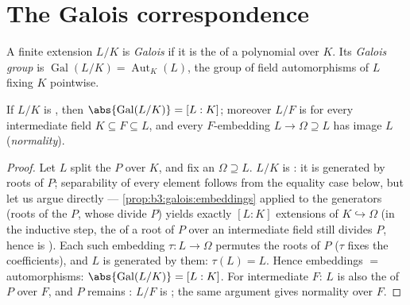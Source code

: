 \section{The Galois correspondence}

\begin{definition}\label{def:b3:galois:galois}
A finite extension $L/K$ is \emph{Galois}
if it is the  of a \emph{} polynomial
over $K$. Its \emph{Galois group} is
$\operatorname{Gal}(L/K) = \operatorname{Aut}_K(L)$, the group of
field automorphisms of $L$ fixing $K$ pointwise.
\end{definition}

\begin{proposition}\label{prop:b3:galois:galoisorder}
If $L/K$ is , then $\abs{\operatorname{Gal}(L/K)} =
[L:K]$; moreover $L/F$ is  for every intermediate field $K
\subseteq F \subseteq L$, and every $F$-embedding $L \to \Omega
\supseteq L$ has image $L$ (\emph{normality}).
\end{proposition}

\begin{proof}
Let $L$ split the  $P$ over $K$, and fix an  $\Omega \supseteq L$. $L/K$ is : it is generated
by roots of $P$; separability of every element follows from the
equality case below, but let us argue directly ---
\cref{prop:b3:galois:embeddings} applied to the generators (roots
of the  $P$, whose  divide $P$)
yields exactly $[L:K]$ extensions of $K \hookrightarrow \Omega$
(in the inductive step, the  of a root of $P$
over an intermediate field still divides $P$, hence is
). Each such embedding $\tau \colon L \to \Omega$
permutes the roots of $P$ ($\tau$ fixes the coefficients), and
$L$ is generated by them: $\tau(L) = L$. Hence embeddings $=$
automorphisms: $\abs{\operatorname{Gal}(L/K)} = [L:K]$. For
intermediate $F$: $L$ is also the  of $P$ over
$F$, and $P$ remains : $L/F$ is ; the same
argument gives normality over $F$.
\end{proof}

